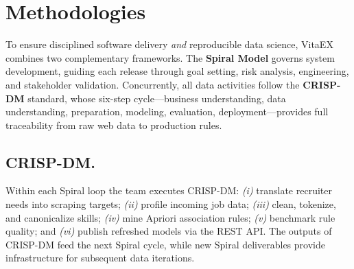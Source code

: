 \documentclass{svproc} %
\begin{document}
	\section{Methodologies}
	To ensure disciplined software delivery \emph{and} reproducible data science, VitaEX combines two complementary frameworks.  
	The \textbf{Spiral Model} governs system development, guiding each release through goal setting, risk analysis, engineering, and stakeholder validation.  
	Concurrently, all data activities follow the \textbf{CRISP-DM} standard, whose six-step cycle—business understanding, data understanding, preparation, modeling, evaluation, deployment—provides full traceability from raw web data to production rules.
	\subsection{\textbf{CRISP-DM.}}
	Within each Spiral loop the team executes CRISP-DM:  
	\emph{(i)} translate recruiter needs into scraping targets;  
	\emph{(ii)} profile incoming job data;  
	\emph{(iii)} clean, tokenize, and canonicalize skills;  
	\emph{(iv)} mine Apriori association rules;  
	\emph{(v)} benchmark rule quality; and  
	\emph{(vi)} publish refreshed models via the REST API.  
	The outputs of CRISP-DM feed the next Spiral cycle, while new Spiral deliverables provide infrastructure for subsequent data iterations.
	
\end{document}
